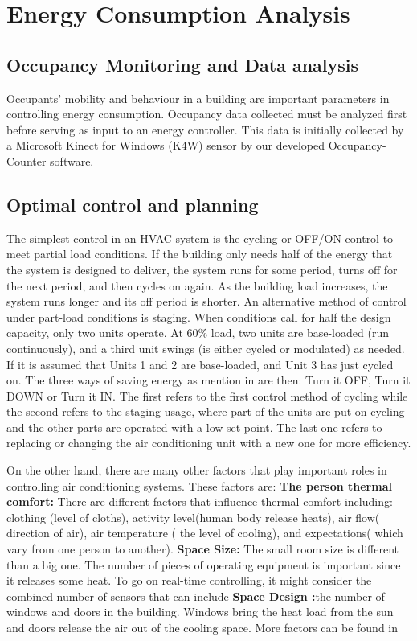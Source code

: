 \section{Energy Consumption Analysis}
\label{sec:control}

\subsection{Occupancy Monitoring and Data analysis}

Occupants' mobility and behaviour in a building are important parameters in controlling energy consumption.  Occupancy data collected  must be analyzed first before serving as input to an energy controller. This data is initially collected by a Microsoft Kinect for Windows (K4W) sensor by our developed Occupancy-Counter software.


\subsection{Optimal control and planning}
The simplest control in an HVAC system is the cycling or OFF/ON control to meet partial load conditions. If the building only needs half of the energy that the system is designed to deliver, the system runs for some period, turns off for the next period, and then cycles on again. As the building load increases, the system runs longer and its off period is shorter. An alternative method of control under part-load conditions is staging. When conditions call for half the design capacity, only two units operate. At 60\% load, two units are base-loaded (run continuously), and a third unit swings (is either cycled or modulated) as needed. If it is assumed that Units 1 and 2 are base-loaded, and Unit 3 has just cycled on. The three ways of saving energy as mention in \cite{fnd} are then: Turn it OFF, Turn it DOWN or Turn it IN. The first refers to the first control method of cycling while the second refers to the staging usage, where part of the units are put on cycling and the other parts are operated with a low set-point. The last one refers to replacing or changing the air conditioning unit with a new one for more efficiency.

On the other hand, there are many other factors that play important roles in controlling air conditioning systems. These factors are:
\textbf{ The person thermal comfort:} There are different factors that influence thermal comfort including: clothing (level of cloths), activity level(human body release heats), air flow( direction of air), air temperature ( the level of cooling), and expectations( which vary from one person to another).
\textbf{ Space Size:} The small room size is different than a big one. The number of pieces of operating equipment is important since it releases some heat. To go on real-time controlling, it might consider the combined number of sensors that can include
\textbf{Space Design :}the number of windows and doors in the building. Windows bring the heat load from the sun and doors release the air out of the cooling space. More factors can be found in \cite{fnd}

